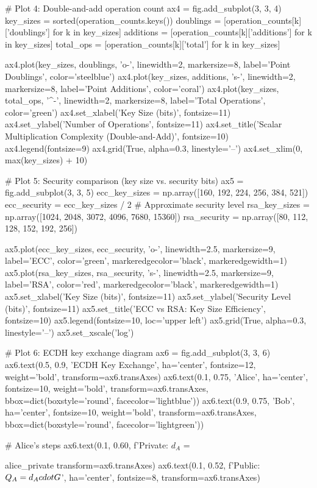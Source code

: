 \documentclass[a4paper, 11pt]{article}
\begin{document}
\begin{pycode}
# Plot 4: Double-and-add operation count
ax4 = fig.add_subplot(3, 3, 4)
key_sizes = sorted(operation_counts.keys())
doublings = [operation_counts[k]['doublings'] for k in key_sizes]
additions = [operation_counts[k]['additions'] for k in key_sizes]
total_ops = [operation_counts[k]['total'] for k in key_sizes]

ax4.plot(key_sizes, doublings, 'o-', linewidth=2, markersize=8, label='Point Doublings', color='steelblue')
ax4.plot(key_sizes, additions, 's-', linewidth=2, markersize=8, label='Point Additions', color='coral')
ax4.plot(key_sizes, total_ops, '^-', linewidth=2, markersize=8, label='Total Operations', color='green')
ax4.set_xlabel('Key Size (bits)', fontsize=11)
ax4.set_ylabel('Number of Operations', fontsize=11)
ax4.set_title('Scalar Multiplication Complexity (Double-and-Add)', fontsize=10)
ax4.legend(fontsize=9)
ax4.grid(True, alpha=0.3, linestyle='--')
ax4.set_xlim(0, max(key_sizes) + 10)

# Plot 5: Security comparison (key size vs. security bits)
ax5 = fig.add_subplot(3, 3, 5)
ecc_key_sizes = np.array([160, 192, 224, 256, 384, 521])
ecc_security = ecc_key_sizes / 2  # Approximate security level
rsa_key_sizes = np.array([1024, 2048, 3072, 4096, 7680, 15360])
rsa_security = np.array([80, 112, 128, 152, 192, 256])

ax5.plot(ecc_key_sizes, ecc_security, 'o-', linewidth=2.5, markersize=9,
         label='ECC', color='green', markeredgecolor='black', markeredgewidth=1)
ax5.plot(rsa_key_sizes, rsa_security, 's-', linewidth=2.5, markersize=9,
         label='RSA', color='red', markeredgecolor='black', markeredgewidth=1)
ax5.set_xlabel('Key Size (bits)', fontsize=11)
ax5.set_ylabel('Security Level (bits)', fontsize=11)
ax5.set_title('ECC vs RSA: Key Size Efficiency', fontsize=10)
ax5.legend(fontsize=10, loc='upper left')
ax5.grid(True, alpha=0.3, linestyle='--')
ax5.set_xscale('log')

# Plot 6: ECDH key exchange diagram
ax6 = fig.add_subplot(3, 3, 6)
ax6.text(0.5, 0.9, 'ECDH Key Exchange', ha='center', fontsize=12, weight='bold',
         transform=ax6.transAxes)
ax6.text(0.1, 0.75, 'Alice', ha='center', fontsize=10, weight='bold',
         transform=ax6.transAxes, bbox=dict(boxstyle='round', facecolor='lightblue'))
ax6.text(0.9, 0.75, 'Bob', ha='center', fontsize=10, weight='bold',
         transform=ax6.transAxes, bbox=dict(boxstyle='round', facecolor='lightgreen'))

# Alice's steps
ax6.text(0.1, 0.60, f'Private: $d_A$ = {alice_private %
         transform=ax6.transAxes)
ax6.text(0.1, 0.52, f'Public: $Q_A = d_A \\cdot G$', ha='center', fontsize=8,
         transform=ax6.transAxes)

}
\end{pycode}
\end{document}
